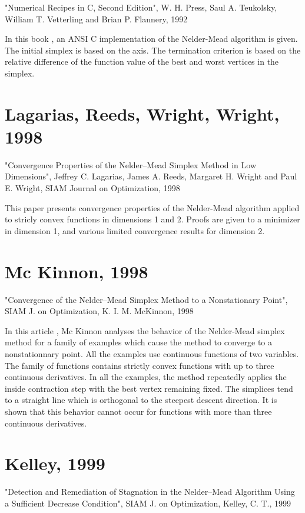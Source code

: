 "Numerical Recipes in C, Second Edition", 
W. H. Press, Saul A. Teukolsky, William T. Vetterling and Brian P. Flannery, 
1992

In this book \cite{NumericalRecipes}, an ANSI C implementation of the Nelder-Mead algorithm is given.
The initial simplex is based on the axis. 
The termination criterion is based on the relative difference of the 
function value of the best and worst vertices in the simplex.

\section{Lagarias, Reeds, Wright, Wright, 1998}

"Convergence Properties of the Nelder--Mead Simplex Method in Low Dimensions", 
Jeffrey C. Lagarias, James A. Reeds, Margaret H. Wright and Paul E. Wright, 
SIAM Journal on Optimization, 1998

This paper \cite{lagarias:112} presents convergence properties of the Nelder-Mead algorithm applied
to stricly convex functions in dimensions 1 and 2. Proofs are given to a minimizer
in dimension 1, and various limited convergence results for dimension 2. 

\section{Mc Kinnon, 1998}

"Convergence of the Nelder--Mead Simplex Method to a Nonstationary Point", 
SIAM J. on Optimization, K. I. M. McKinnon, 1998

In this article \cite{589109}, Mc Kinnon analyses the behavior of the 
Nelder-Mead simplex method for a family of examples which cause the 
method to converge to a nonstationnary point. All the examples use 
continuous functions of two variables. The family of functions contains
strictly convex functions with up to three continuous derivatives.
In all the examples, the method repeatedly applies the inside 
contraction step with the best vertex remaining fixed. The simplices
tend to a straight line which is orthogonal to the steepest descent 
direction. It is shown that this behavior cannot occur for functions
with more than three continuous derivatives.

\section{Kelley, 1999}

"Detection and Remediation of Stagnation in the Nelder--Mead Algorithm Using a Sufficient Decrease Condition", 
SIAM J. on Optimization, Kelley, C. T., 1999

